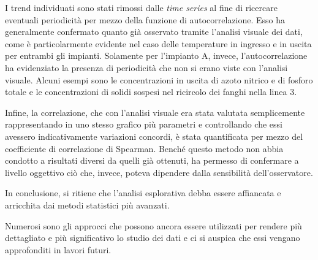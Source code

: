 I trend individuati sono stati rimossi dalle \textit{time series} al fine di ricercare eventuali periodicità per mezzo della funzione di autocorrelazione. Esso ha generalmente confermato quanto già osservato tramite l'analisi visuale dei dati, come è particolarmente evidente nel caso delle temperature in ingresso e in uscita per entrambi gli impianti. Solamente per l'impianto A, invece, l'autocorrelazione ha evidenziato la presenza di periodicità che non si erano viste con l'analisi visuale. Alcuni esempi sono le concentrazioni in uscita di azoto nitrico e di fosforo totale e le concentrazioni di solidi sospesi nel ricircolo dei fanghi nella linea 3.

Infine, la correlazione, che con l'analisi visuale era stata valutata semplicemente rappresentando in uno stesso grafico più parametri e controllando che essi avessero indicativamente variazioni concordi, è stata quantificata per mezzo del coefficiente di correlazione di Spearman. Benché questo metodo non abbia condotto a risultati diversi da quelli già ottenuti, ha permesso di confermare a livello oggettivo ciò che, invece, poteva dipendere dalla sensibilità dell'osservatore.

In conclusione, si ritiene che l'analisi esplorativa debba essere affiancata e arricchita dai metodi statistici più avanzati.

Numerosi sono gli approcci che possono ancora essere utilizzati per rendere più dettagliato e più significativo lo studio dei dati e ci si auspica che essi vengano approfonditi in lavori futuri.


